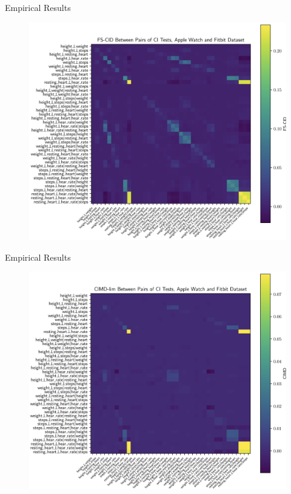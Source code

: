 \documentclass{beamer}
\begin{document}
\begin{frame}{Empirical Results}
	\begin{figure}
		\includegraphics[scale=0.12]{imgs/empirical1.png}
	\end{figure}
\end{frame}

\begin{frame}{Empirical Results}
	\begin{figure}
		\includegraphics[scale=0.12]{imgs/empirical2.png}
	\end{figure}
\end{frame}
\end{document}
